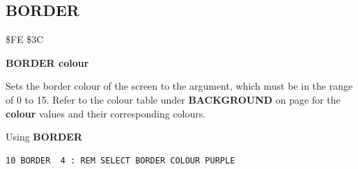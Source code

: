 
\newpage
\subsection{BORDER}
\begin{description}[leftmargin=2cm,style=nextline]
\item [Token:] \$FE \$3C
\item [Format:] {\bf BORDER colour}
\item [Usage:] Sets the border colour
               of the screen to the argument, which must be in the
               range of 0 to 15. Refer to the colour table under
               {\bf BACKGROUND} on page \pageref{colourtable}
               for the {\bf colour} values and their corresponding colours.
\item [Example:] Using {\bf BORDER}
\begin{tcolorbox}[colback=black,coltext=white]
\verbatimfont{\codefont}
\begin{verbatim}
10 BORDER  4 : REM SELECT BORDER COLOUR PURPLE
\end{verbatim}
\end{tcolorbox}
\end{description}


\newpage
